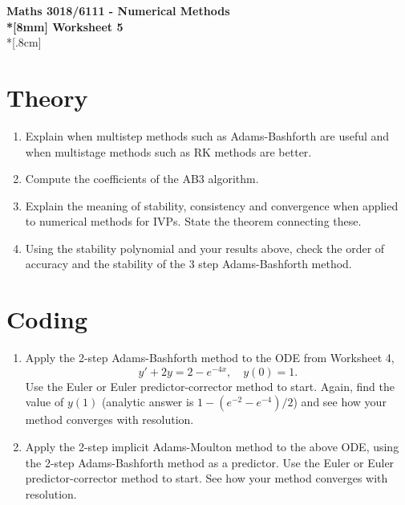\documentclass[10pt]{article}
\begin{document}
\thispagestyle{empty}
\begin{center}
\textbf{\Large Maths 3018/6111 - Numerical Methods \\*[8mm]
Worksheet 5}\\*[.8cm]
\end{center}

\section*{Theory}

\begin{enumerate}
\item Explain when multistep methods such as Adams-Bashforth are
  useful and when multistage methods such as RK methods are better.
\item Compute the coefficients of the AB3 algorithm.
\item Explain the meaning of stability, consistency and convergence
  when applied to numerical methods for IVPs. State the theorem
  connecting these.
\item Using the stability polynomial and your results above, check the
  order of accuracy and the stability of the 3 step Adams-Bashforth
  method. 
\end{enumerate}

\section*{Coding}

\begin{enumerate}
\item Apply the 2-step Adams-Bashforth method to the ODE from
  Worksheet 4, 
  \begin{equation*}
    y' + 2 y = 2 - e^{-4 x}, \quad y(0) = 1.
  \end{equation*}
  Use the Euler or Euler predictor-corrector method to start. Again,
  find the value of $y(1)$ (analytic answer is $1 -
  (e^{-2}-e^{-4})/2$) and see how your method converges with
  resolution.
\item Apply the 2-step implicit Adams-Moulton method to the above ODE,
  using the 2-step Adams-Bashforth method as a predictor. Use the
  Euler or Euler predictor-corrector method to start. See how your
  method converges with resolution.

\end{enumerate}
\end{document}
